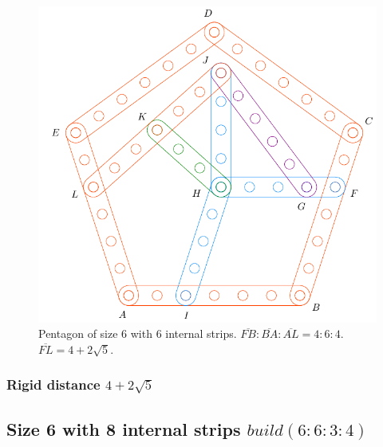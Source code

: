 \documentclass[11pt]{article}
\begin{document}
\begin{figure}[H]
\centering
\includegraphics[scale=0.7]{6/penta6-6a}
\caption{Pentagon of size 6 with 6 internal strips. $\overline{FB} : \overline{BA} : \overline{AL} = 4:6:4$. $\overline{FL} = 4 + 2\sqrt5$.}
\label{fig:penta6-6a}
\end{figure}

\subsubsection{Rigid distance $4 + 2\sqrt5$}

\subsection{Size 6 with 8 internal strips $build(6:6:3:4)$}
\end{document}

